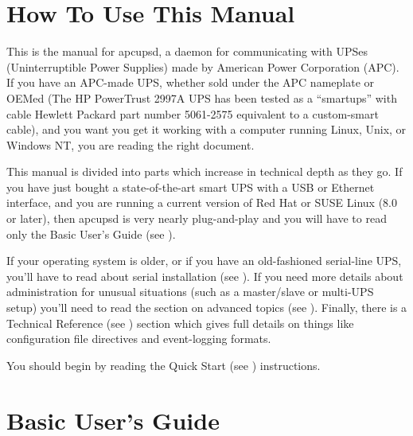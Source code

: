 
\label{How-To-Use-This-Manual}

\section*{How To Use This Manual}

\label{index-Using-this-Manual-3}
This is the manual for apcupsd, a daemon for communicating with UPSes
(Uninterruptible Power Supplies) made by American Power Corporation (APC).  If
you have an APC-made UPS, whether sold under the APC nameplate or OEMed (The
HP PowerTrust 2997A UPS has been tested as a ``smartups'' with cable Hewlett
Packard part number 5061-2575 equivalent to a custom-smart cable), and you
want you get it working with a computer running Linux, Unix, or Windows NT,
you are reading the right document.  

This manual is divided into parts which increase in technical depth as they
go.  If you have just bought a state-of-the-art smart UPS with a USB or
Ethernet interface, and you are running a current version of Red Hat or SUSE
Linux (8.0 or later), then apcupsd is very nearly plug-and-play and you will
have to read only the Basic User's Guide (see 
).  

If your operating system is older, or if you have an old-fashioned serial-line
UPS, you'll have to read about serial installation (see 
).  If you need more
details about administration for unusual situations (such as a master/slave or
multi-UPS setup) you'll need to read the section on advanced topics (see 
). Finally, there is a
Technical Reference (see 
) section which
gives full details on things like configuration file directives and
event-logging formats.  

You should begin by reading the Quick Start (see 
)
instructions. 

\label{Basic-User_0027s-Guide}

\section*{Basic User's Guide}

